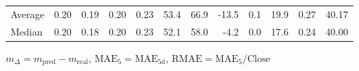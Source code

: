 \begin{threeparttable}
{\begin{tabular}{lrrrrrrrrrrr}
Average &          0.20 &          0.19 &          0.20 &        0.23 &                53.4 &                66.9 &      -13.5 &                 0.1 &             19.9 &            0.27 &                  40.17 \\
 Median &          0.20 &          0.18 &          0.20 &        0.23 &                52.1 &                58.0 &       -4.2 &                 0.0 &             17.6 &            0.24 &                  40.00 \\
\bottomrule
\end{tabular}
}
\begin{tablenotes}\footnotesize
\item $m_\Delta=m_{\text{pred}}-m_{\text{real}}$,
$\mathrm{MAE}_5=\mathrm{MAE}_{5\text{d}}$,
$\mathrm{RMAE}=\mathrm{MAE}_5/\text{Close}$
\end{tablenotes}
\end{threeparttable}
\endgroup

